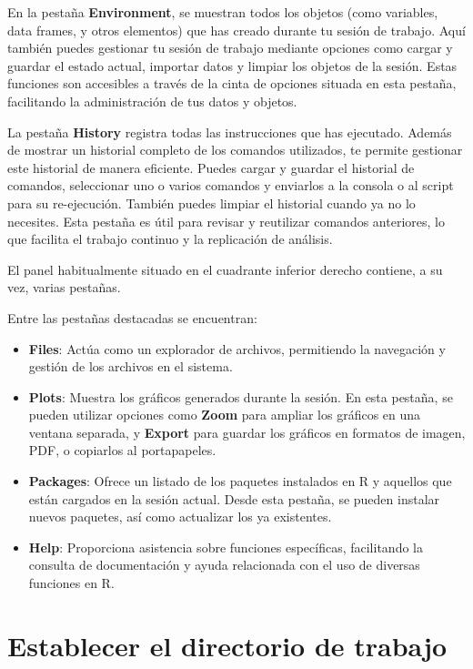 \documentclass[
  letterpaper,
]{scrbook}
\begin{document}
En la pestaña \textbf{Environment}, se muestran todos los objetos (como
variables, data frames, y otros elementos) que has creado durante tu
sesión de trabajo. Aquí también puedes gestionar tu sesión de trabajo
mediante opciones como cargar y guardar el estado actual, importar datos
y limpiar los objetos de la sesión. Estas funciones son accesibles a
través de la cinta de opciones situada en esta pestaña, facilitando la
administración de tus datos y objetos.

La pestaña \textbf{History} registra todas las instrucciones que has
ejecutado. Además de mostrar un historial completo de los comandos
utilizados, te permite gestionar este historial de manera eficiente.
Puedes cargar y guardar el historial de comandos, seleccionar uno o
varios comandos y enviarlos a la consola o al script para su
re-ejecución. También puedes limpiar el historial cuando ya no lo
necesites. Esta pestaña es útil para revisar y reutilizar comandos
anteriores, lo que facilita el trabajo continuo y la replicación de
análisis.

El panel habitualmente situado en el cuadrante inferior derecho
contiene, a su vez, varias pestañas.

Entre las pestañas destacadas se encuentran:

\begin{itemize}
\item
  \textbf{Files}: Actúa como un explorador de archivos, permitiendo la
  navegación y gestión de los archivos en el sistema.
\item
  \textbf{Plots}: Muestra los gráficos generados durante la sesión. En
  esta pestaña, se pueden utilizar opciones como \textbf{Zoom} para
  ampliar los gráficos en una ventana separada, y \textbf{Export} para
  guardar los gráficos en formatos de imagen, PDF, o copiarlos al
  portapapeles.
\item
  \textbf{Packages}: Ofrece un listado de los paquetes instalados en R y
  aquellos que están cargados en la sesión actual. Desde esta pestaña,
  se pueden instalar nuevos paquetes, así como actualizar los ya
  existentes.
\item
  \textbf{Help}: Proporciona asistencia sobre funciones específicas,
  facilitando la consulta de documentación y ayuda relacionada con el
  uso de diversas funciones en R.
\end{itemize}

\hypertarget{establecer-el-directorio-de-trabajo}{%
\section{Establecer el directorio de
trabajo}\label{establecer-el-directorio-de-trabajo}}
\end{document}
